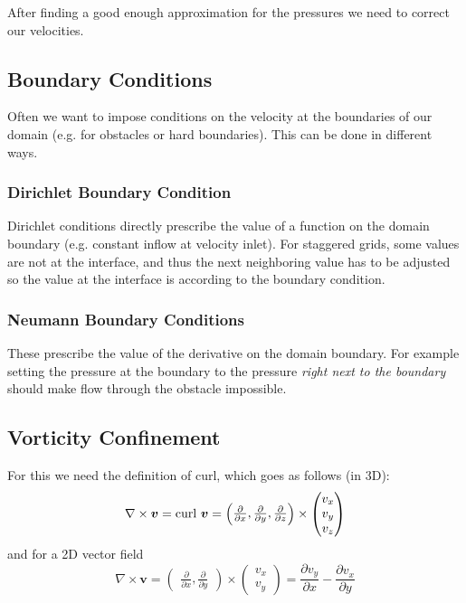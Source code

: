 \documentclass{article}
\begin{document}
After finding a good enough approximation for the pressures we need to correct our velocities.

\subsection{Boundary Conditions}
Often we want to impose conditions on the velocity at the boundaries of our domain (e.g. for obstacles or hard boundaries).
This can be done in different ways.

\subsubsection{Dirichlet Boundary Condition}
Dirichlet conditions directly prescribe the value of a function on the domain boundary (e.g. constant inflow at velocity inlet).
For staggered grids, some values are not at the interface, and thus the next neighboring value has to be adjusted so the value at the interface is according to the boundary condition.

\subsubsection{Neumann Boundary Conditions}
These prescribe the value of the derivative on the domain boundary.
For example setting the pressure at the boundary to the pressure \textit{right next to the boundary} should make flow through the obstacle impossible.

\subsection{Vorticity Confinement}
For this we need the definition of curl, which goes as follows (in 3D):
\begin{equation}
    \nabla \times \bm{v} = \textup{curl } \bm{v} = \begin{pmatrix} \frac{\partial}{\partial x}, \frac{\partial}{\partial y}, \frac{\partial}{\partial z} \end{pmatrix} \times \begin{pmatrix} v_x \\ v_y \\ v_z \end{pmatrix}
\end{equation}
and for a 2D vector field
\begin{equation}
    \nabla \times \bm{v} = \begin{pmatrix} \frac{\partial}{\partial x}, \frac{\partial}{\partial y} \end{pmatrix} \times \begin{pmatrix} v_x \\ v_y \end{pmatrix} = \frac{\partial v_y}{\partial x} - \frac{\partial v_x}{\partial y}
\end{equation}
\end{document}
